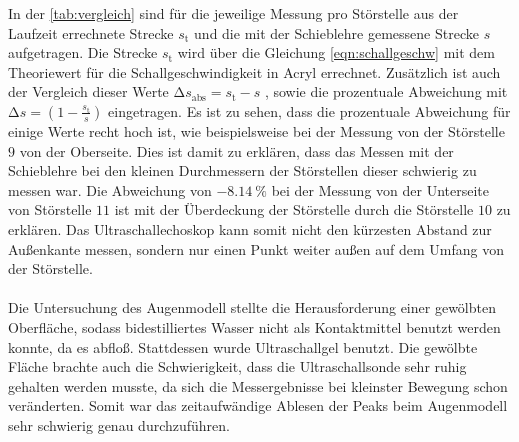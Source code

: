 \noindent In der \autoref{tab:vergleich} sind für die jeweilige Messung pro Störstelle aus der Laufzeit errechnete Strecke $s_{\text{t}}$ und 
die mit der Schieblehre gemessene Strecke $s$ aufgetragen. Die Strecke $s_{\text{t}}$ wird über die Gleichung \eqref{eqn:schallgeschw} mit dem Theoriewert für 
die Schallgeschwindigkeit in Acryl errechnet. Zusätzlich ist auch der Vergleich dieser Werte $ \increment s_{\text{abs}} = s_{\text{t}} - s $ , sowie die 
prozentuale Abweichung mit $ \increment s = (1-\frac{s_{\text{t}}}{s})$ eingetragen.
Es ist zu sehen, dass die prozentuale Abweichung für einige Werte recht hoch ist, wie beispielsweise bei der Messung von der Störstelle $9$ von der Oberseite.
Dies ist damit zu erklären, dass das Messen mit der Schieblehre bei den kleinen Durchmessern der Störstellen dieser schwierig zu messen war. 
Die Abweichung von $\SI{-8.14}{\percent}$ bei der Messung von der Unterseite von Störstelle $11$ ist mit der Überdeckung der Störstelle durch die Störstelle $10$ 
zu erklären. Das Ultraschallechoskop kann somit nicht den kürzesten Abstand zur Außenkante messen, sondern nur einen Punkt weiter außen auf dem Umfang von der Störstelle. \\
\\
\noindent Die Untersuchung des Augenmodell stellte die Herausforderung einer gewölbten Oberfläche, sodass bidestilliertes Wasser nicht als Kontaktmittel benutzt 
werden konnte, da es abfloß. Stattdessen wurde Ultraschallgel benutzt. Die gewölbte Fläche brachte auch die Schwierigkeit, dass die Ultraschallsonde sehr ruhig 
gehalten werden musste, da sich die Messergebnisse bei kleinster Bewegung schon veränderten. Somit war das zeitaufwändige Ablesen der Peaks beim Augenmodell
sehr schwierig genau durchzuführen. 